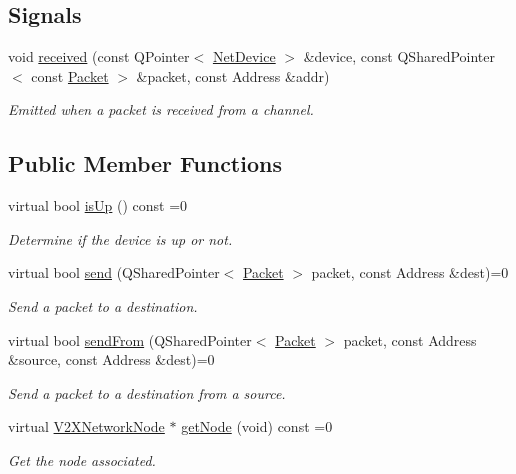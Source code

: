 \subsection*{Signals}
\begin{DoxyCompactItemize}
\item 
void \hyperlink{classNetDevice_a9d3e4d70c602da165460c1fd5da86bcb}{received} (const Q\+Pointer$<$ \hyperlink{classNetDevice}{Net\+Device} $>$ \&device, const Q\+Shared\+Pointer$<$ const \hyperlink{group__V2XFramework_ga1b82bfc289dbcb9aced56200d7abc964}{Packet} $>$ \&packet, const Address \&addr)
\begin{DoxyCompactList}\small\item\em Emitted when a packet is received from a channel. \end{DoxyCompactList}\end{DoxyCompactItemize}
\subsection*{Public Member Functions}
\begin{DoxyCompactItemize}
\item 
virtual bool \hyperlink{classNetDevice_a30b09e09a2b54cdfb41342aba5750196}{is\+Up} () const =0
\begin{DoxyCompactList}\small\item\em Determine if the device is up or not. \end{DoxyCompactList}\item 
virtual bool \hyperlink{classNetDevice_af454c2180f83e8a25791621ad0d119f5}{send} (Q\+Shared\+Pointer$<$ \hyperlink{group__V2XFramework_ga1b82bfc289dbcb9aced56200d7abc964}{Packet} $>$ packet, const Address \&dest)=0
\begin{DoxyCompactList}\small\item\em Send a packet to a destination. \end{DoxyCompactList}\item 
virtual bool \hyperlink{classNetDevice_a25395de765edd09a9585dd5c66519cf8}{send\+From} (Q\+Shared\+Pointer$<$ \hyperlink{group__V2XFramework_ga1b82bfc289dbcb9aced56200d7abc964}{Packet} $>$ packet, const Address \&source, const Address \&dest)=0
\begin{DoxyCompactList}\small\item\em Send a packet to a destination from a source. \end{DoxyCompactList}\item 
virtual \hyperlink{classV2XNetworkNode}{V2\+X\+Network\+Node} $\ast$ \hyperlink{classNetDevice_a34ebef976ef91e805d49982c8b8b8510}{get\+Node} (void) const =0
\begin{DoxyCompactList}\small\item\em Get the node associated. \end{DoxyCompactList}\end{DoxyCompactItemize}


